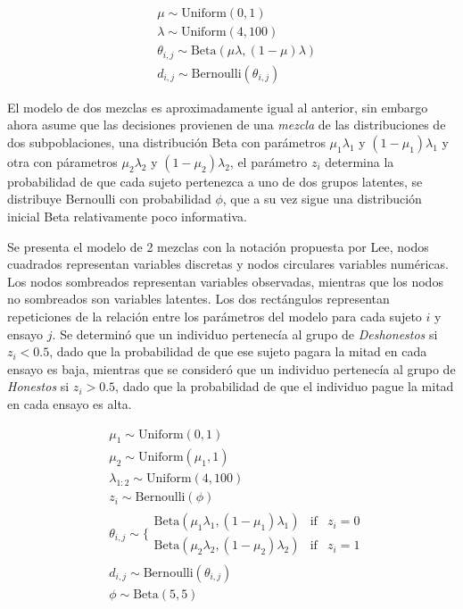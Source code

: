 \documentclass[]{article}
\begin{document}
\[
\begin{aligned}
&\mu \sim \mathrm{Uniform}(0, 1)\\
&\lambda \sim \mathrm{Uniform}(4, 100)\\
&\theta_{i,j} \sim \mathrm{Beta}(\mu\lambda, (1 - \mu)\lambda)\\
&d_{i,j} \sim \mathrm{Bernoulli}(\theta_{i,j}) 
\end{aligned}
\]

El modelo de dos mezclas es aproximadamente igual al anterior, sin
embargo ahora asume que las decisiones provienen de una \emph{mezcla} de
las distribuciones de dos subpoblaciones, una distribución Beta con
parámetros \(\mu_1\lambda_1\) y \((1 - \mu_1) \lambda_1\) y otra con
párametros \(\mu_2\lambda_2\) y \((1 - \mu_2) \lambda_2\), el parámetro
\(z_i\) determina la probabilidad de que cada sujeto pertenezca a uno de
dos grupos latentes, se distribuye Bernoulli con probabilidad \(\phi\),
que a su vez sigue una distribución inicial Beta relativamente poco
informativa.

Se presenta el modelo de 2 mezclas con la notación propuesta por Lee,
nodos cuadrados representan variables discretas y nodos circulares
variables numéricas. Los nodos sombreados representan variables
observadas, mientras que los nodos no sombreados son variables latentes.
Los dos rectángulos representan repeticiones de la relación entre los
parámetros del modelo para cada sujeto \(i\) y ensayo \(j\). Se
determinó que un individuo pertenecía al grupo de \emph{Deshonestos} si
\(z_i < 0.5\), dado que la probabilidad de que ese sujeto pagara la
mitad en cada ensayo es baja, mientras que se consideró que un individuo
pertenecía al grupo de \emph{Honestos} si \(z_i > 0.5\), dado que la
probabilidad de que el individuo pague la mitad en cada ensayo es alta.

\[
\begin{aligned} 
&\mu_1 \sim \mathrm{Uniform}(0, 1)\\
&\mu_2 \sim \mathrm{Uniform}(\mu_1, 1)\\
&\lambda_{1:2} \sim \mathrm{Uniform}(4, 100)\\
&z_i \sim \mathrm{Bernoulli}(\phi)\\
&\theta_{i,j} \sim \Bigg\{
  \begin{array} {lr} 
    \mathrm{Beta}(\mu_1\lambda_1, (1 - \mu_1)\lambda_1) & \mbox{if} & z_i = 0 \\
    \mathrm{Beta}(\mu_2\lambda_2, (1 - \mu_2)\lambda_2) & \mbox{if} & z_i = 1
  \end{array} \\
&d_{i,j} \sim \mathrm{Bernoulli}(\theta_{i,j})\\
&\phi \sim \mathrm{Beta}(5, 5)
\end{aligned}
\]
\end{document}
